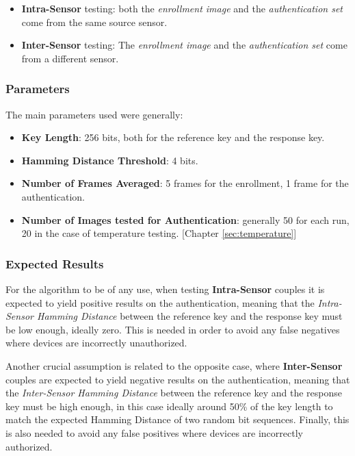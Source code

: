 \begin{itemize}
	\item \textbf{Intra-Sensor} testing: both the \emph{enrollment image} and the \emph{authentication set} come from the same source sensor.
	\item \textbf{Inter-Sensor} testing: The \emph{enrollment image} and the \emph{authentication set} come from a different sensor.
\end{itemize}

\subsubsection{Parameters}
The main parameters used were generally:
\begin{itemize}
	\item \textbf{Key Length}: 256 bits, both for the reference key and the response key.
	\item \textbf{Hamming Distance Threshold}: 4 bits.
	\item \textbf{Number of Frames Averaged}: 5 frames for the enrollment, 1 frame for the authentication.
	\item \textbf{Number of Images tested for Authentication}: generally 50 for each run, 20 in the case of temperature testing. [Chapter \ref{sec:temperature}]
\end{itemize}

\subsubsection{Expected Results}

For the algorithm to be of any use, when testing \textbf{Intra-Sensor} couples it is expected to yield positive results on the authentication, meaning that the \emph{Intra-Sensor Hamming Distance} between the reference key and the response key must be low enough, ideally zero. This is needed in order to avoid any false negatives where devices are incorrectly unauthorized.

Another crucial assumption is related to the opposite case, where \textbf{Inter-Sensor} couples are expected to yield negative results on the authentication, meaning that the \emph{Inter-Sensor Hamming Distance} between the reference key and the response key must be high enough, in this case ideally around 50\% of the key length to match the expected Hamming Distance of two random bit sequences. Finally, this is also needed to avoid any false positives where devices are incorrectly authorized.

